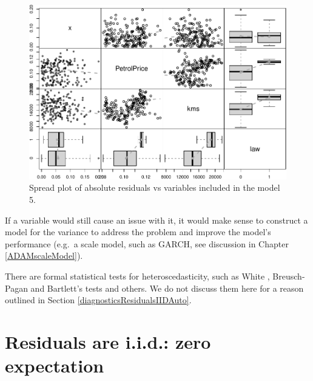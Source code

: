 \documentclass[
]{book}
\theoremstyle{definition}
\theoremstyle{definition}
\theoremstyle{definition}
\theoremstyle{definition}
\theoremstyle{remark}
\begin{document}
\begin{figure}
\centering
\includegraphics{Svetunkov--2022----ADAM_files/figure-latex/adamModelSeat05Spread-1.pdf}
\caption{\label{fig:adamModelSeat05Spread}Spread plot of absolute residuals vs variables included in the model 5.}
\end{figure}

If a variable would still cause an issue with it, it would make sense to construct a model for the variance to address the problem and improve the model's performance (e.g.~a scale model, such as GARCH, see discussion in Chapter \ref{ADAMscaleModel}).

There are formal statistical tests for heteroscedasticity, such as White \citep{WikipediaWhite2021}, Breusch-Pagan \citep{WikipediaBreuschPagan2021} and Bartlett's \citep{WikipediaBartlett2021} tests and others. We do not discuss them here for a reason outlined in Section \ref{diagnosticsResidualsIIDAuto}.

\hypertarget{diagnosticsResidualsIIDExpectation}{%
\section{Residuals are i.i.d.: zero expectation}\label{diagnosticsResidualsIIDExpectation}}
\end{document}
